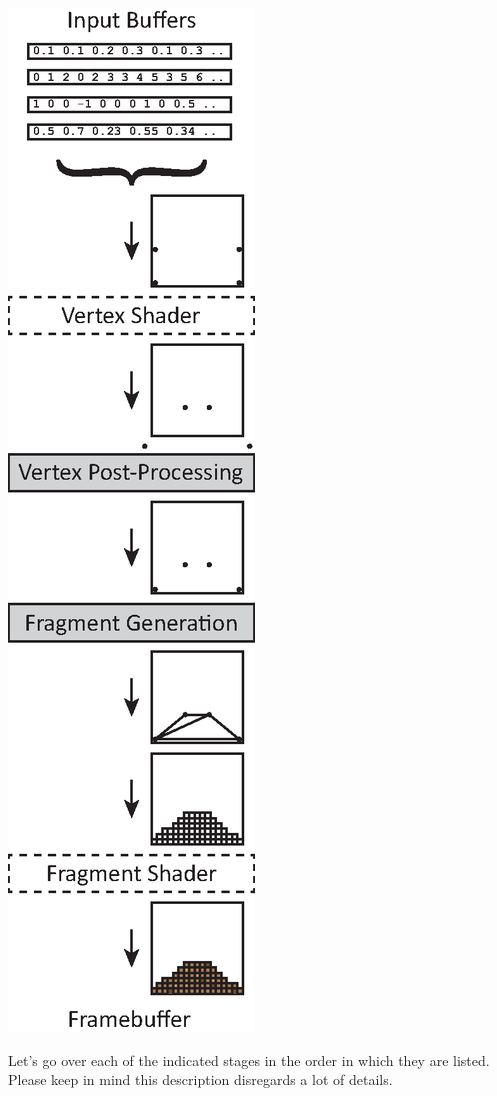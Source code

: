 \centerline{\includegraphics[scale=1.1]{images/pipeline-overview.eps}}

Let's go over each of the indicated stages in the order in which they are listed. Please keep in mind this description disregards a lot of details. 

